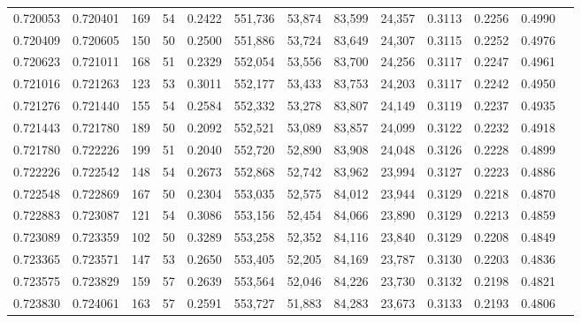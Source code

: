 \begin{tabular}{rrrrrrrrrrrrr}
0.720053 & 0.720401 &   169 &  54 &                                     0.2422 & 551,736 &  53,874 &  83,599 &  24,357 & 0.3113 & 0.2256 & 0.4990 \\
0.720409 & 0.720605 &   150 &  50 &                                     0.2500 & 551,886 &  53,724 &  83,649 &  24,307 & 0.3115 & 0.2252 & 0.4976 \\
0.720623 & 0.721011 &   168 &  51 &                                     0.2329 & 552,054 &  53,556 &  83,700 &  24,256 & 0.3117 & 0.2247 & 0.4961 \\
0.721016 & 0.721263 &   123 &  53 &                                     0.3011 & 552,177 &  53,433 &  83,753 &  24,203 & 0.3117 & 0.2242 & 0.4950 \\
0.721276 & 0.721440 &   155 &  54 &                                     0.2584 & 552,332 &  53,278 &  83,807 &  24,149 & 0.3119 & 0.2237 & 0.4935 \\
0.721443 & 0.721780 &   189 &  50 &                                     0.2092 & 552,521 &  53,089 &  83,857 &  24,099 & 0.3122 & 0.2232 & 0.4918 \\
0.721780 & 0.722226 &   199 &  51 &                                     0.2040 & 552,720 &  52,890 &  83,908 &  24,048 & 0.3126 & 0.2228 & 0.4899 \\
0.722226 & 0.722542 &   148 &  54 &                                     0.2673 & 552,868 &  52,742 &  83,962 &  23,994 & 0.3127 & 0.2223 & 0.4886 \\
0.722548 & 0.722869 &   167 &  50 &                                     0.2304 & 553,035 &  52,575 &  84,012 &  23,944 & 0.3129 & 0.2218 & 0.4870 \\
0.722883 & 0.723087 &   121 &  54 &                                     0.3086 & 553,156 &  52,454 &  84,066 &  23,890 & 0.3129 & 0.2213 & 0.4859 \\
0.723089 & 0.723359 &   102 &  50 &                                     0.3289 & 553,258 &  52,352 &  84,116 &  23,840 & 0.3129 & 0.2208 & 0.4849 \\
0.723365 & 0.723571 &   147 &  53 &                                     0.2650 & 553,405 &  52,205 &  84,169 &  23,787 & 0.3130 & 0.2203 & 0.4836 \\
0.723575 & 0.723829 &   159 &  57 &                                     0.2639 & 553,564 &  52,046 &  84,226 &  23,730 & 0.3132 & 0.2198 & 0.4821 \\
0.723830 & 0.724061 &   163 &  57 &                                     0.2591 & 553,727 &  51,883 &  84,283 &  23,673 & 0.3133 & 0.2193 & 0.4806 \\

\end{tabular}
